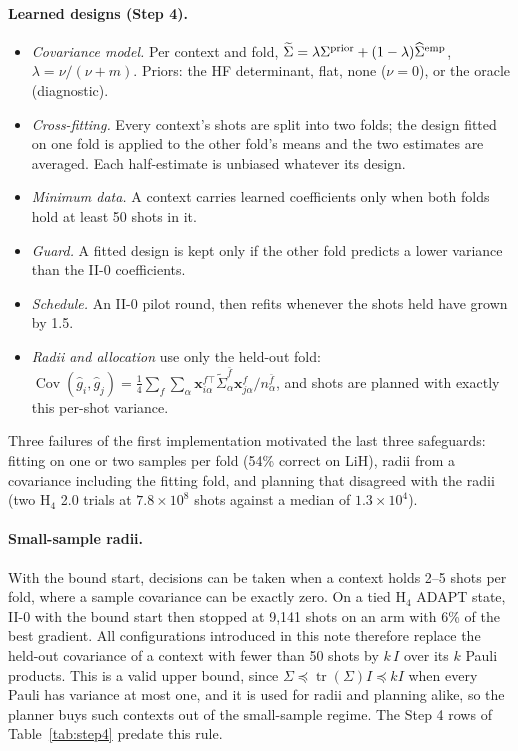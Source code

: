 \documentclass[10.5pt]{article}
\newcommand{\Cov}{\operatorname{Cov}}
\begin{document}
\paragraph{Learned designs (Step 4).}
\begin{itemize}
  \item \emph{Covariance model.} Per context and fold, $\widetilde\Sigma=\lambda\Sigma^{\rm prior}+(1-\lambda)\widehat\Sigma^{\rm emp}$, $\lambda=\nu/(\nu+m)$. Priors: the HF determinant, flat, none ($\nu=0$), or the oracle (diagnostic).
  \item \emph{Cross-fitting.} Every context's shots are split into two folds; the design fitted on one fold is applied to the other fold's means and the two estimates are averaged. Each half-estimate is unbiased whatever its design.
  \item \emph{Minimum data.} A context carries learned coefficients only when both folds hold at least 50 shots in it.
  \item \emph{Guard.} A fitted design is kept only if the other fold predicts a lower variance than the II-0 coefficients.
  \item \emph{Schedule.} An II-0 pilot round, then refits whenever the shots held have grown by 1.5.
  \item \emph{Radii and allocation} use only the held-out fold: $\Cov(\hat g_i,\hat g_j)=\tfrac14\sum_f\sum_\alpha\bm x^{f\top}_{i\alpha}\widetilde\Sigma^{\bar f}_\alpha\bm x^{f}_{j\alpha}/n^{\bar f}_\alpha$, and shots are planned with exactly this per-shot variance.
\end{itemize}
Three failures of the first implementation motivated the last three safeguards: fitting on one or two samples per fold (54\% correct on LiH), radii from a covariance including the fitting fold, and planning that disagreed with the radii (two H$_4$ 2.0 trials at $7.8\times10^8$ shots against a median of $1.3\times10^4$).

\paragraph{Small-sample radii.}
With the bound start, decisions can be taken when a context holds 2--5 shots per fold, where a sample covariance can be exactly zero. On a tied H$_4$ ADAPT state, II-0 with the bound start then stopped at 9{,}141 shots on an arm with 6\% of the best gradient. All configurations introduced in this note therefore replace the held-out covariance of a context with fewer than 50 shots by $k\,I$ over its $k$ Pauli products. This is a valid upper bound, since $\Sigma\preceq\operatorname{tr}(\Sigma)I\preceq kI$ when every Pauli has variance at most one, and it is used for radii and planning alike, so the planner buys such contexts out of the small-sample regime. The Step 4 rows of Table~\ref{tab:step4} predate this rule.
\end{document}
